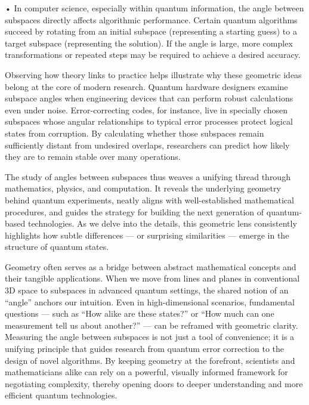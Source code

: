 • In computer science, especially within quantum information, the angle between subspaces directly affects algorithmic performance. Certain quantum algorithms succeed by rotating from an initial subspace (representing a starting guess) to a target subspace (representing the solution). If the angle is large, more complex transformations or repeated steps may be required to achieve a desired accuracy.

Observing how theory links to practice helps illustrate why these geometric ideas belong at the core of modern research. Quantum hardware designers examine subspace angles when engineering devices that can perform robust calculations even under noise. Error-correcting codes, for instance, live in specially chosen subspaces whose angular relationships to typical error processes protect logical states from corruption. By calculating whether those subspaces remain sufficiently distant from undesired overlaps, researchers can predict how likely they are to remain stable over many operations.

The study of angles between subspaces thus weaves a unifying thread through mathematics, physics, and computation. It reveals the underlying geometry behind quantum experiments, neatly aligns with well-established mathematical procedures, and guides the strategy for building the next generation of quantum-based technologies. As we delve into the details, this geometric lens consistently highlights how subtle differences — or surprising similarities — emerge in the structure of quantum states.

\begin{commentary}
Geometry often serves as a bridge between abstract mathematical concepts and their tangible applications. When we move from lines and planes in conventional 3D space to subspaces in advanced quantum settings, the shared notion of an “angle” anchors our intuition. Even in high-dimensional scenarios, fundamental questions — such as “How alike are these states?” or “How much can one measurement tell us about another?” — can be reframed with geometric clarity. Measuring the angle between subspaces is not just a tool of convenience; it is a unifying principle that guides research from quantum error correction to the design of novel algorithms. By keeping geometry at the forefront, scientists and mathematicians alike can rely on a powerful, visually informed framework for negotiating complexity, thereby opening doors to deeper understanding and more efficient quantum technologies.
\end{commentary}